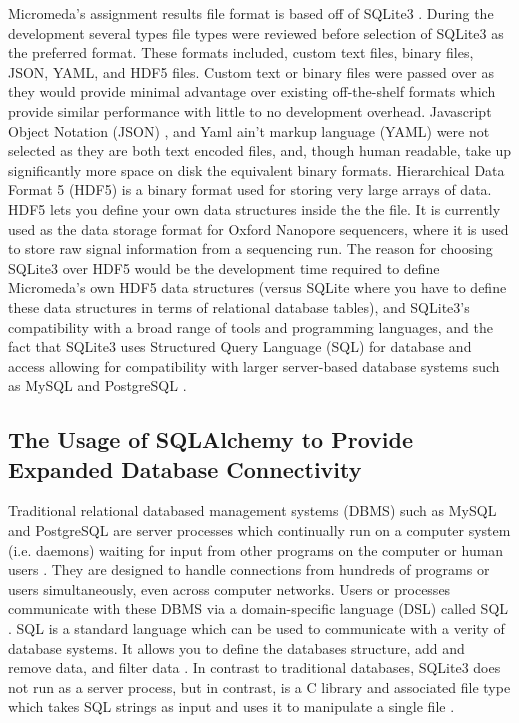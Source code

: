 Micromeda's assignment results file format is based off of SQLite3 \cite{owens2006definitive}. During the development several types file types were reviewed before selection of SQLite3 as the preferred format. These formats included, custom text files, binary files, JSON, YAML, and HDF5 files. Custom text or binary files were passed over as they would provide minimal advantage over existing off-the-shelf formats which provide similar performance with little to no development overhead. Javascript Object Notation (JSON) , and Yaml ain't markup language (YAML) \cite{ben2005yaml} were not selected as they are both text encoded files, and, though human readable, take up significantly more space on disk the equivalent binary formats. Hierarchical Data Format 5 (HDF5) \cite{folk2011overview} is a binary format used for storing very large arrays of data. HDF5 lets you define your own data structures inside the the file. It is currently used as the data storage format for Oxford Nanopore sequencers, where it is used to store raw signal information from a sequencing run. The reason for choosing SQLite3 over HDF5 would be the development time required to define Micromeda's own HDF5 data structures (versus SQLite where you have to define these data structures in terms of relational database tables), and SQLite3's compatibility with a broad range of tools and programming languages, and the fact that SQLite3 uses Structured Query Language (SQL) \cite{sql1987guide} for database and access allowing for compatibility with larger server-based database systems such as MySQL \cite{dubois1999mysql} and PostgreSQL \cite{momjian2001postgresql, owens2006definitive}. 

\subsection{The Usage of SQLAlchemy to Provide Expanded Database Connectivity}

Traditional relational databased management systems (DBMS) such as MySQL and PostgreSQL are server processes which continually run on a computer system (i.e. daemons) waiting for input from other programs on the computer or human users \cite{dubois1999mysql, momjian2001postgresql}. They are designed to handle connections from hundreds of programs or users simultaneously, even across computer networks. Users or processes communicate with these DBMS via a domain-specific language (DSL) called SQL \cite{sql1987guide}. SQL is a standard language which can be used to communicate with a verity of database systems. It allows you to define the databases structure, add and remove data, and filter data \cite{sql1987guide}. In contrast to traditional databases, SQLite3 does not run as a server process, but in contrast, is a C library and associated file type which takes SQL strings as input and uses it to manipulate a single file \cite{owens2006definitive}. 

